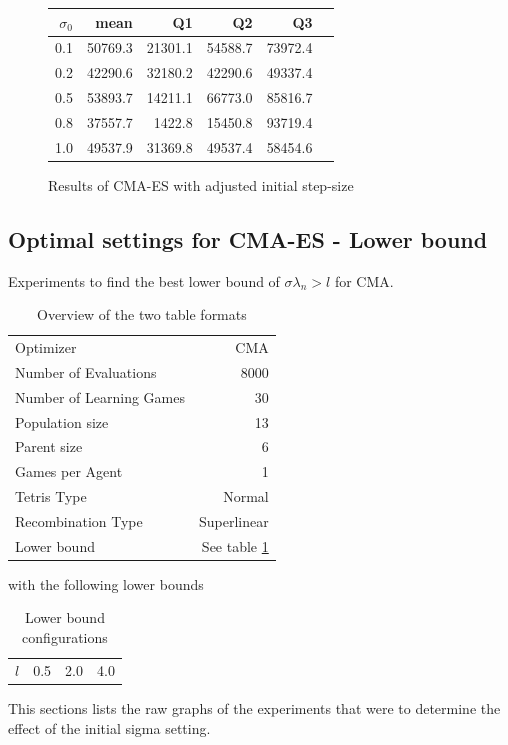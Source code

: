 \begin{figure}[H]
\centering
\begin{tabular}{r | r r r r r}
$\sigma_0$ & mean & Q1 & Q2 & Q3\\
\hline
0.1 & 50769.3 & 21301.1 & 54588.7 & 73972.4\\
0.2 & 42290.6 & 32180.2 & 42290.6 & 49337.4\\
0.5 & 53893.7 & 14211.1 & 66773.0 & 85816.7\\
0.8 & 37557.7 & 1422.8  & 15450.8 & 93719.4\\
1.0 & 49537.9 & 31369.8 & 49537.4 & 58454.6
\end{tabular}
\caption{Results of CMA-ES with adjusted initial step-size \label{CMAInitialSigmaConfigTestAppendix}}
\end{figure}


\clearpage

\subsection{Optimal settings for CMA-ES - Lower bound \label{appendixCMALowerBound}}
Experiments to find the best lower bound of $\sigma \lambda_n > l$ for CMA.

\begin{table}[h]
\centering
\caption{Overview of the two table formats}
\begin{tabular}{l r}
Optimizer & CMA\\
Number of Evaluations & 8000\\
Number of Learning Games &30\\
Population size& 13\\
Parent size & 6\\
Games per Agent & 1\\
Tetris Type & Normal\\
\hline
Recombination Type & Superlinear\\
Lower bound & See table \ref{appendixLowerBound}
\end{tabular}
\end{table}

with the following lower bounds

\begin{table}[H]
\centering
\begin{tabular}{c | c c c}
$l$ & 0.5 & 2.0 & 4.0
\end{tabular}
\caption{Lower bound configurations \label{appendixLowerBound}}
\end{table}
This sections lists the raw graphs of the experiments that were
to determine the effect of the initial sigma setting. 

